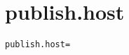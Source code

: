 \section{publish.host}
\label{configuration:PublishHost}
\AvailableInCsharpOnly{\TODO}
\begin{lstlisting}[style=Props,caption={Usage example for \textit{publish.host}}]
publish.host=
\end{lstlisting}